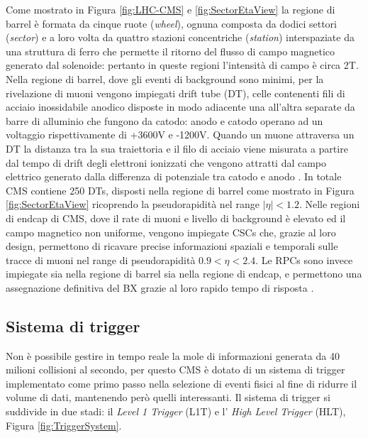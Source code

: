 Come mostrato in Figura \ref{fig:LHC-CMS} e \ref{fig:SectorEtaView} la regione di barrel è formata da cinque ruote (\textit{wheel}), ognuna composta da dodici settori (\textit{sector}) e a loro volta da quattro stazioni concentriche (\textit{station}) interspaziate da una struttura di ferro che permette il ritorno del flusso di campo magnetico generato dal solenoide: pertanto in queste regioni l'intensità di campo è circa 2T. Nella regione di barrel, dove gli eventi di background sono minimi, per la rivelazione di muoni vengono impiegati drift tube (DT), celle contenenti fili di acciaio inossidabile anodico disposte in modo adiacente una all'altra separate da barre di alluminio che fungono da catodo: anodo e catodo operano ad un voltaggio rispettivamente di +3600V e -1200V. Quando un muone attraversa un DT la distanza tra la sua traiettoria e il filo di acciaio viene misurata a partire dal tempo di drift degli elettroni ionizzati che vengono attratti dal campo elettrico generato dalla differenza di potenziale tra catodo e anodo \cite{MasterThesisNicLai}. \newline
In totale CMS contiene 250 DTs, disposti nella regione di barrel come mostrato in Figura \ref{fig:SectorEtaView} ricoprendo la pseudorapidità nel range $|\eta| < 1.2$. \newline
Nelle regioni di endcap di CMS, dove il rate di muoni e livello di background è elevato ed il campo magnetico non uniforme, vengono impiegate CSCs che, grazie al loro design, permettono di ricavare precise informazioni spaziali e temporali sulle tracce di muoni nel range di pseudorapidità $0.9 < \eta < 2.4$. Le RPCs sono invece impiegate sia nella regione di barrel sia nella regione di endcap, e permettono una assegnazione definitiva del BX grazie al loro rapido tempo di risposta \cite{MasterThesisNicLai, cms2008cms}.


\subsection{Sistema di trigger}
\label{sec:SistemaDiTrigger}

Non è possibile gestire in tempo reale la mole di informazioni generata da 40 milioni collisioni al secondo, per questo CMS è dotato di un sistema di trigger implementato come primo passo nella selezione di eventi fisici al fine di ridurre il volume di dati, mantenendo però quelli interessanti. Il sistema di trigger si suddivide in due stadi: il \textit{Level 1 Trigger} (L1T) e l' \textit{High Level Trigger} (HLT), Figura \ref{fig:TriggerSystem}. 

